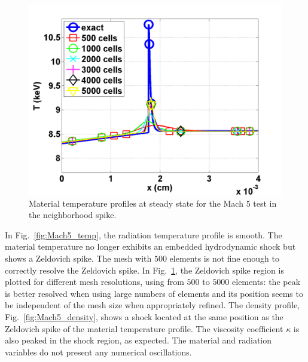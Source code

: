 \documentclass[review]{elsarticle}
\newcommand{\fig}[1]{Fig.~\ref{#1}}                      %
\begin{document}
\begin{figure}[H]
                \centering
                \includegraphics[width=\textwidth]{Mach_5_comparison.png}
        \caption{Material temperature profiles at steady state for the Mach 5 test in the neighborhood spike.}\label{fig:Mach5_comparison}
\end{figure}
In \fig{fig:Mach5_temp}, the radiation temperature profile is smooth. The material temperature no longer exhibits an embedded hydrodynamic shock but shows a Zeldovich spike. The mesh with $500$ elements is not fine enough to correctly resolve the Zeldovich spike. In \fig{fig:Mach5_comparison}, the Zeldovich spike region is plotted for different mesh resolutions, using from $500$ to $5000$ elements: the peak is better resolved when using large numbers of elements and its position seems to be independent of the mesh size when appropriately refined. The density profile, \fig{fig:Mach5_density}, shows a shock located at the same position as the Zeldovich spike of the material temperature profile. The viscosity coefficient $\kappa$ is also peaked in the shock region, as expected. The material and radiation variables do not present any numerical oscillations. 
\end{document}
